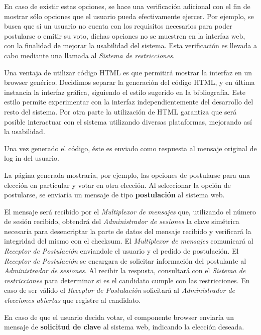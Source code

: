 En caso de existir estas opciones, se hace una verificación adicional con el fin de mostrar sólo opciones que el usuario pueda efectivamente ejercer.  
Por ejemplo, se busca que si un usuario no cuenta con los requisitos necesarios para poder postularse o emitir su voto, dichas opciones no se muestren en la interfaz web, con la finalidad de mejorar la usabilidad del sistema. 
Esta verificación es llevada a cabo mediante una llamada al \emph{Sistema de restricciones}.


Una ventaja de utilizar código HTML es que permitirá mostrar la interfaz en un browser genérico. 
Decidimos separar la generación del código HTML, y en última instancia la interfaz gráfica, siguiendo el estilo sugerido en la bibliografía. 
Este estilo permite experimentar con la interfaz independientemente del desarrollo del resto del sistema. 
Por otra parte la utilización de HTML garantiza que será posible interactuar con el sistema utilizando diversas plataformas, mejorando así la usabilidad.


Una vez generado el código, éste es enviado como respuesta al mensaje original de log in del usuario. 

La página generada mostraría, por ejemplo, las opciones de postularse para una elección en particular y votar en otra elección. Al seleccionar la opción de postularse, se enviaría un mensaje de tipo {\bf postulación} al sistema web. 

El mensaje será recibido por el \emph{Multiplexor de mensajes} que, utilizando el número de sesión recibido, obtendrá del \emph{Administrador de sesiones} la clave simétrica necesaria para desencriptar la parte de datos del mensaje recibido y verificará la integridad del mismo con el checksum.
El \emph{Multiplexor de mensajes} comunicará al \emph{Receptor de Postulación} enviandole el usuario y el pedido de postulación. El \emph{Receptor de Postulación} se encargara de solicitar información del postulante al \emph{Administrador de sesiones}. Al recibir la respusta, consultar\'a con el \emph{Sistema de restricciones} para determinar si es el candidato cumple con las restricciones. En caso de ser v\'alido el \emph{Receptor de Postulación} solicitará al \emph{Administrador de elecciones abiertas} que registre al candidato.

En caso de que el usuario decida votar, el componente browser enviaría un mensaje de {\bf solicitud de clave} al sistema web, indicando la elección deseada. 

